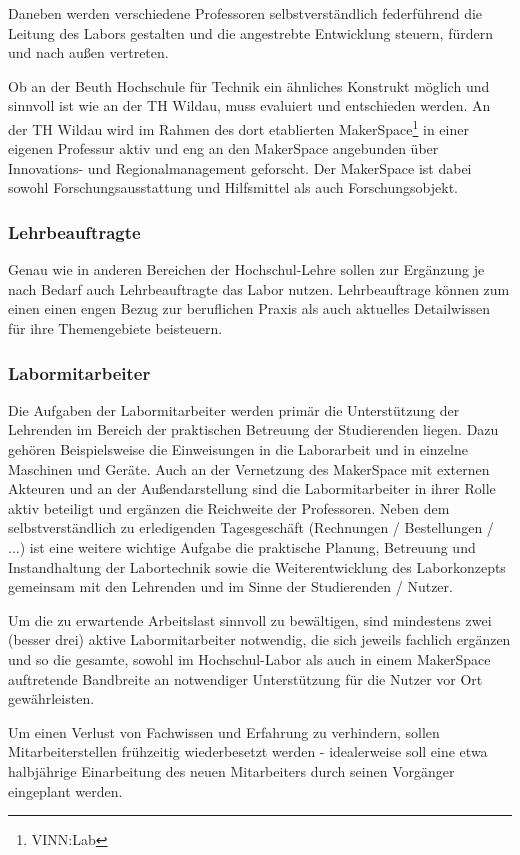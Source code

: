 \documentclass[parskip=half,headsepline,footsepline,titlepage]{scrartcl}
\begin{document}
Daneben werden verschiedene Professoren selbstverständlich federführend die Leitung des Labors gestalten und die angestrebte Entwicklung steuern, fürdern und nach außen vertreten.

Ob an der Beuth Hochschule für Technik ein ähnliches Konstrukt möglich und sinnvoll ist wie an der TH Wildau, muss evaluiert und entschieden werden. An der TH Wildau wird im Rahmen des dort etablierten MakerSpace\footnote{VINN:Lab} in einer eigenen Professur aktiv und eng an den MakerSpace angebunden über Innovations- und Regionalmanagement geforscht. Der MakerSpace ist dabei sowohl Forschungsausstattung und Hilfsmittel als auch Forschungsobjekt.

\subsubsection{Lehrbeauftragte}
Genau wie in anderen Bereichen der Hochschul-Lehre sollen zur Ergänzung je nach Bedarf auch Lehrbeauftragte das Labor nutzen. Lehrbeauftrage können zum einen einen engen Bezug zur beruflichen Praxis als auch aktuelles Detailwissen für ihre Themengebiete beisteuern.

\subsubsection{Labormitarbeiter}
Die Aufgaben der Labormitarbeiter werden primär die Unterstützung der Lehrenden im Bereich der praktischen Betreuung der Studierenden liegen. Dazu gehören Beispielsweise die Einweisungen in die Laborarbeit und in einzelne Maschinen und Geräte.
Auch an der Vernetzung des MakerSpace mit externen Akteuren und an der Außendarstellung sind die Labormitarbeiter in ihrer Rolle aktiv beteiligt und ergänzen die Reichweite der Professoren.
Neben dem selbstverständlich zu erledigenden Tagesgeschäft (Rechnungen / Bestellungen / ...) ist eine weitere wichtige Aufgabe die praktische Planung, Betreuung und Instandhaltung der Labortechnik sowie die Weiterentwicklung des Laborkonzepts gemeinsam mit den Lehrenden und im Sinne der Studierenden / Nutzer.

Um die zu erwartende Arbeitslast sinnvoll zu bewältigen, sind mindestens zwei (besser drei) aktive Labormitarbeiter notwendig, die sich jeweils fachlich ergänzen und so die gesamte, sowohl im Hochschul-Labor als auch in einem MakerSpace auftretende Bandbreite an notwendiger Unterstützung für die Nutzer vor Ort gewährleisten.

Um einen Verlust von Fachwissen und Erfahrung zu verhindern, sollen Mitarbeiterstellen frühzeitig wiederbesetzt werden - idealerweise soll eine etwa halbjährige Einarbeitung des neuen Mitarbeiters durch seinen Vorgänger eingeplant werden.
\end{document}
